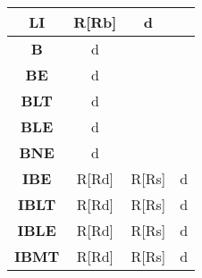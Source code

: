 \documentclass[a4paper,11pt,titlepage]{ltjsarticle}%
\begin{document}
\begin{table}[htbp]
\begin{tabular}{|c|c|c|c|}
\textbf{LI}   & R{[}Rb{]}     & d             &               \\ \hline
\textbf{B}    & d             &               &               \\ \hline
\textbf{BE}   & d             &               &               \\ \hline
\textbf{BLT}  & d             &               &               \\ \hline
\textbf{BLE}  & d             &               &               \\ \hline
\textbf{BNE}  & d             &               &               \\ \hline
\textbf{IBE}  & R{[}Rd{]}     & R{[}Rs{]}     & d             \\ \hline
\textbf{IBLT} & R{[}Rd{]}     & R{[}Rs{]}     & d             \\ \hline
\textbf{IBLE} & R{[}Rd{]}     & R{[}Rs{]}     & d             \\ \hline
\textbf{IBMT} & R{[}Rd{]}     & R{[}Rs{]}     & d             \\ \hline

\end{tabular}
\end{table}
\end{document}
